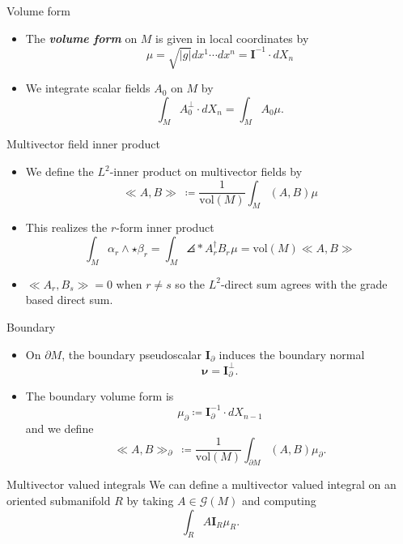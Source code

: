 \documentclass[aspectratio=169]{beamer}
\newcommand\boldgreen[1]{\textcolor{lighter_csu_green}{\emph{\textbf{#1}}}}
\newcommand{\G}{\mathcal{G}}
\newcommand{\blade}[1]{\boldsymbol{#1}}
\newcommand{\multivecinnerproduct}[2]{\ll #1, #2\gg}
\newcommand{\boundary}{{\partial M}}
\newcommand{\pseudoscalar}{\blade{I}}
\DeclarePairedDelimiter\angles{\langle}{\rangle}
\newcommand{\proj}[2]{\angles*{#2}_{#1}}
\begin{document}
\begin{frame}{Volume form}
\vfill
\begin{itemize}
    \pause
    \item The \boldgreen{volume form} on $M$ is given in local coordinates by 
    \[
    \mu = \sqrt{|g|}dx^1\cdots dx^n = \pseudoscalar^{-1} \cdot dX_n
    \]
    \pause
    \item We integrate scalar fields $A_0$ on $M$ by
    \[
    \int_M A_0^\perp \cdot dX_n =  \int_M A_0 \mu.
    \]
\end{itemize}
\vfill
\end{frame}

\begin{frame}{Multivector field inner product}
\vfill
\begin{itemize}
\pause
\item We define the $L^2$-inner product on multivector fields by 
\[
\multivecinnerproduct{A}{B}~ \coloneqq \frac{1}{\textrm{vol}(M)} \int_M (A,B)\mu
\]
\vspace*{-0.1cm}
\pause
\item This realizes the $r$-form inner product
\[
\int_M \alpha_r \wedge \star \beta_r = \int_M \proj{}{A_r^\dagger B_r}\mu = \textrm{vol}(M)\multivecinnerproduct{A}{B}
\]
\vspace*{-0.1cm}
\pause
\item $\multivecinnerproduct{A_r}{B_s}=0$ when $r\neq s$ so the $L^2$-direct sum agrees with the grade based direct sum.
\end{itemize}
\vfill
\end{frame}

\begin{frame}{Boundary}
\vfill
\begin{itemize}
\pause
\item On $\partial M$, the boundary pseudoscalar $\pseudoscalar_{\partial}$ induces the boundary normal 
\[
\blade{\nu} = \pseudoscalar_\partial^\perp.
\]
\vspace*{-0.25cm}
\pause
\item The boundary volume form is
\[
\mu_\partial \coloneqq \pseudoscalar_\partial^{-1} \cdot dX_{n-1}
\] 
and we define 
\[
\multivecinnerproduct{A}{B}_\partial~ \coloneqq \frac{1}{\textrm{vol}(M)}\int_{\boundary} (A,B)\mu_\partial.
\]
\end{itemize}
\vfill
\end{frame}

\begin{frame}{Multivector valued integrals}
\vfill
We can define a multivector valued integral on an oriented submanifold $R$ by taking $A\in \G(M)$ and computing
\[
\int_R A \pseudoscalar_R \mu_R.
\]
\vfill
\end{frame}
\end{document}
